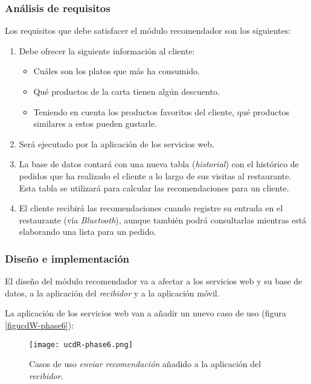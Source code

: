 \subsubsection{Análisis de requisitos}
Los requisitos que debe satisfacer el módulo recomendador son los siguientes:
\begin{enumerate}
\item Debe ofrecer la siguiente información al cliente:
  \begin{itemize}
  \item Cuáles son los platos que más ha consumido.
  \item Qué productos de la carta tienen algún descuento.
  \item Teniendo en cuenta los productos favoritos del cliente, qué productos
  similares a estos pueden gustarle.
  \end{itemize}
\item Será ejecutado por la aplicación de los servicios web.
\item La base de datos contará con una nueva tabla (\emph{historial}) con el
histórico de pedidos que ha realizado el cliente a lo largo de sus visitas
al restaurante. Esta tabla se utilizará para calcular las recomendaciones para
un cliente.
\item El cliente recibirá las recomendaciones cuando registre su entrada en el
restaurante (vía \emph{Bluetooth}), aunque también podrá consultarlas mientras
está elaborando una lista para un pedido.
\end{enumerate}

\subsubsection{Diseño e implementación}
El diseño del módulo recomendador va a afectar a los servicios web y su
base de datos, a la aplicación del \emph{recibidor} y a la aplicación
móvil.

La aplicación de los servicios web van a añadir un nuevo caso de uso (figura
\ref{figucdW-phase6}):

  \begin{figure}[H]
    \begin{center}
      \texttt{[image: ucdR-phase6.png]}
      \caption{Casos de uso \emph{enviar recomendación} añadido a la aplicación 
      del \emph{recibidor}.}
      \label{fig:ucdR-phase6}
    \end{center}
  \end{figure}

